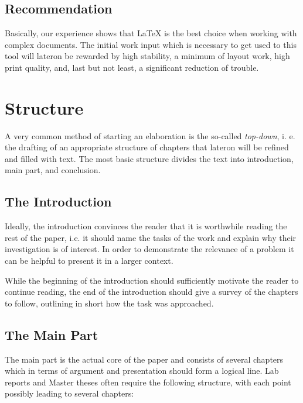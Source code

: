 \section{Recommendation}
Basically, our experience shows that LaTeX is the best choice when working with complex
documents. The initial work input which is necessary to get used to this tool will lateron
be rewarded by high stability, a minimum of layout work, high print quality, and, last
but not least, a significant reduction of trouble.


\chapter{Structure}

A very common method of starting an elaboration is the so-called \emph{top-down},
i. e. the drafting of an appropriate structure of chapters that lateron will
be refined and filled with text. The most basic structure divides the text
into introduction, main part, and conclusion.
 

\section{The Introduction}

Ideally, the introduction convinces the reader that it is worthwhile reading the
rest of the paper, i.e. it should name the tasks of the work and explain
why their investigation is of interest. In order to demonstrate the relevance
of a problem it can be helpful to present it in a larger context.

While the beginning of the introduction should sufficiently motivate the reader 
to continue reading, the end of the introduction should give a survey of the
chapters to follow, outlining in short how the task was approached.


\section{The Main Part}

The main part is the actual core of the paper and consists of several chapters
which in terms of argument and presentation should form a logical line.
Lab reports and Master theses often require the following structure, with each
point possibly leading to several chapters:



